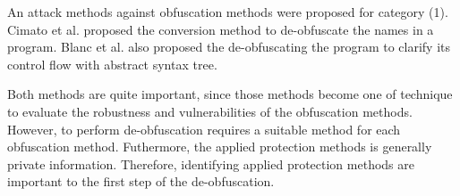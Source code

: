 \documentclass[conference]{IEEEtran}
\begin{document}
An attack methods against obfuscation methods were proposed for
category (1)\cite{cimato05jss}.
%
Cimato et al. proposed the conversion method to de-obfuscate the names
in a program.
%
Blanc et al. also proposed the de-obfuscating the program to clarify
its control flow with abstract syntax tree\cite{preda06amast}.

Both methods are quite important, since those methods become one of
technique to evaluate the robustness and vulnerabilities of the
obfuscation methods.  However, to perform de-obfuscation requires a
suitable method for each obfuscation method.  Futhermore, the applied
protection methods is generally private information.  Therefore,
identifying applied protection methods are important to the first step
of the de-obfuscation.

% 
\end{document}
